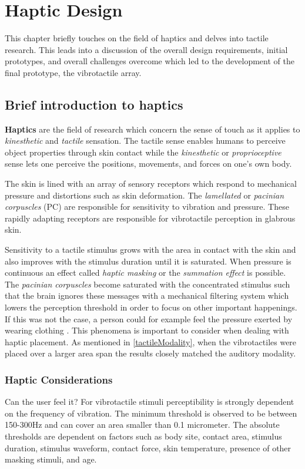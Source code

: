 \chapter{Haptic Design}
This chapter briefly touches on the field of haptics and delves into tactile research. This leads into a discussion of the overall design requirements, initial prototypes, and overall challenges overcome which led to the development of the final prototype, the vibrotactile array.

\section{Brief introduction to haptics}
\textbf{Haptics} are the field of research which concern the sense of touch as it applies to \textit{kinesthetic} and \textit{tactile} sensation. The tactile sense enables humans to perceive object properties through skin contact while the \textit{kinesthetic} or \textit{proprioceptive} sense lets one perceive the positions, movements, and forces on one's own body. 

The skin is lined with an array of sensory receptors which respond to mechanical pressure and distortions such as skin deformation. The \textit{lamellated} or \textit{pacinian corpuscles} (PC) are responsible for sensitivity to vibration and pressure. These rapidly adapting receptors are responsible for vibrotactile perception in glabrous skin. 

Sensitivity to a tactile stimulus grows with the area in contact with the skin and also improves with the stimulus duration until it is saturated. When pressure is continuous an effect called \textit{haptic masking} or the \textit{summation effect} is possible. The \textit{pacinian corpuscles} become saturated with the concentrated stimulus such that the brain ignores these messages with a mechanical filtering system which lowers the perception threshold in order to focus on other important happenings. If this was not the case, a person could for example feel the pressure exerted by wearing clothing \cite{choi2013vibrotactile}. This phenomena is important to consider when dealing with haptic placement. As mentioned in \ref{tactileModality}, when the vibrotactiles were placed over a larger area span the results closely matched the auditory modality.

\subsection{Haptic Considerations}
Can the user feel it?
For vibrotactile stimuli perceptibility is strongly dependent on the frequency of vibration. The minimum threshold is observed to be between 150-300Hz and can cover an area smaller than 0.1 micrometer. The absolute thresholds are dependent on factors such as body site, contact area, stimulus duration, stimulus waveform, contact force, skin temperature, presence of other masking stimuli, and age.

